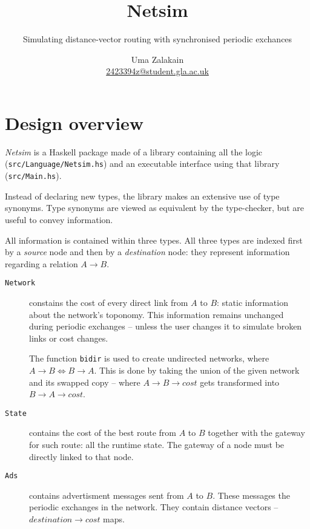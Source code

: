 \documentclass{scrartcl}
\begin{document}
\title{Netsim}
\subtitle{Simulating distance-vector routing with synchronised periodic exchances}
\author{Uma Zalakain \\ \href{mailto:2423394z@student.gla.ac.uk}{2423394z@student.gla.ac.uk}}

\maketitle
\vfill
\doclicenseThis
\newpage

\section{Design overview}

\textit{Netsim} is a Haskell package made of a library containing all the logic
(\texttt{src/Language/Netsim.hs}) and an executable interface using that library
(\texttt{src/Main.hs}).

Instead of declaring new types, the library makes an extensive use of type
synonyms. Type synonyms are viewed as equivalent by the type-checker, but are
useful to convey information.

All information is contained within three types. All three types are indexed
first by a \textit{source} node and then by a \textit{destination} node: they
represent information regarding a relation $A \rightarrow B$.

\begin{description}
    \item [\texttt{Network}] constains the cost of every direct link from $A$ to
        $B$: static information about the network's toponomy. This information
        remains unchanged during periodic exchanges -- unless the user changes
        it to simulate broken links or cost changes.
        
        The function \texttt{bidir} is used to create undirected networks, where
        $A \rightarrow B \iff B \rightarrow A$. This is done by taking the union
        of the given network and its swapped copy -- where $A \rightarrow B
        \rightarrow cost$ gets transformed into $B \rightarrow A \rightarrow
        cost$.

    \item [\texttt{State}] contains the cost of the best route from $A$ to $B$
        together with the gateway for such route: all the runtime state. The
        gateway of a node must be directly linked to that node. 

    \item [\texttt{Ads}] contains advertisment messages sent from $A$ to $B$.
        These messages the periodic exchanges in the network. They contain
        distance vectors -- $destination \rightarrow cost$ maps.
\end{description}
\end{document}

